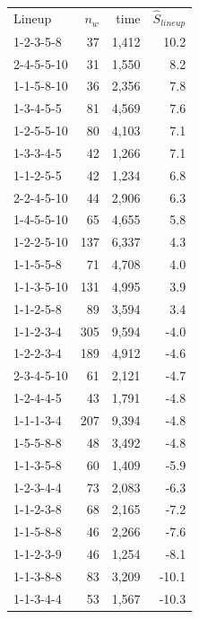 \begin{tabular}{lrrr}
Lineup & $n_w$ & time & $\hat{S}_{lineup}$ \\
1-2-3-5-8 & 37 & 1,412 & 10.2 \\
2-4-5-5-10 & 31 & 1,550 & 8.2 \\
1-1-5-8-10 & 36 & 2,356 & 7.8 \\
1-3-4-5-5 & 81 & 4,569 & 7.6 \\
1-2-5-5-10 & 80 & 4,103 & 7.1 \\
1-3-3-4-5 & 42 & 1,266 & 7.1 \\
1-1-2-5-5 & 42 & 1,234 & 6.8 \\
2-2-4-5-10 & 44 & 2,906 & 6.3 \\
1-4-5-5-10 & 65 & 4,655 & 5.8 \\
1-2-2-5-10 & 137 & 6,337 & 4.3 \\
1-1-5-5-8 & 71 & 4,708 & 4.0 \\
1-1-3-5-10 & 131 & 4,995 & 3.9 \\
1-1-2-5-8 & 89 & 3,594 & 3.4 \\
1-1-2-3-4 & 305 & 9,594 & -4.0 \\
1-2-2-3-4 & 189 & 4,912 & -4.6 \\
2-3-4-5-10 & 61 & 2,121 & -4.7 \\
1-2-4-4-5 & 43 & 1,791 & -4.8 \\
1-1-1-3-4 & 207 & 9,394 & -4.8 \\
1-5-5-8-8 & 48 & 3,492 & -4.8 \\
1-1-3-5-8 & 60 & 1,409 & -5.9 \\
1-2-3-4-4 & 73 & 2,083 & -6.3 \\
1-1-2-3-8 & 68 & 2,165 & -7.2 \\
1-1-5-8-8 & 46 & 2,266 & -7.6 \\
1-1-2-3-9 & 46 & 1,254 & -8.1 \\
1-1-3-8-8 & 83 & 3,209 & -10.1 \\
1-1-3-4-4 & 53 & 1,567 & -10.3 \\
\end{tabular}
